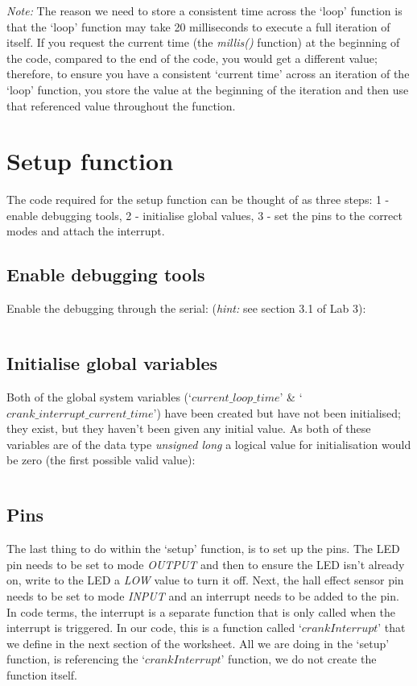 \documentclass[11pt,a4paper]{article}
\begin{document}
\noindent
\textit{Note:} The reason we need to store a consistent time across the `loop' function is that the `loop' function may take 20 milliseconds to execute a full iteration of itself. If you request the current time (the \textit{millis()} function) at the beginning of the code, compared to the end of the code, you would get a different value; therefore, to ensure you have a consistent `current time' across an iteration of the `loop' function, you store the value at the beginning of the iteration and then use that referenced value throughout the function.\\

\section{Setup function}
The code required for the setup function can be thought of as three steps: 1 - enable debugging tools, 2 - initialise global values, 3 - set the pins to the correct modes and attach the interrupt.

\subsection{Enable debugging tools}
Enable the debugging through the serial: (\textit{hint:} see section 3.1 of Lab 3):\\
\vspace{-1.75em}
\inputminted{arduino}{./src/3-setup-debug.txt}
\vspace{.75em}

\subsection{Initialise global variables}
Both of the global system variables (`$current\_loop\_time$' \& `$crank\_interrupt\_current\_time$') have been created but have not been initialised; they exist, but they haven't been given any initial value. As both of these variables are of the data type \textit{unsigned long} a logical value for initialisation would be zero (the first possible valid value):\\
\vspace{-1.75em}
\inputminted{arduino}{./src/4-setup-defaults.txt}
\vspace{.75em}

\subsection{Pins}
The last thing to do within the `setup' function, is to set up the pins. The LED pin needs to be set to mode \textit{OUTPUT} and then to ensure the LED isn't already on, write to the LED a \textit{LOW} value to turn it off. Next, the hall effect sensor pin needs to be set to mode \textit{INPUT} and an interrupt needs to be added to the pin. In code terms, the interrupt is a separate function that is only called when the interrupt is triggered. In our code, this is a function called `$crankInterrupt$' that we define in the next section of the worksheet. All we are doing in the `setup' function, is referencing the `$crankInterrupt$' function, we do not create the function itself.\\
\end{document}
